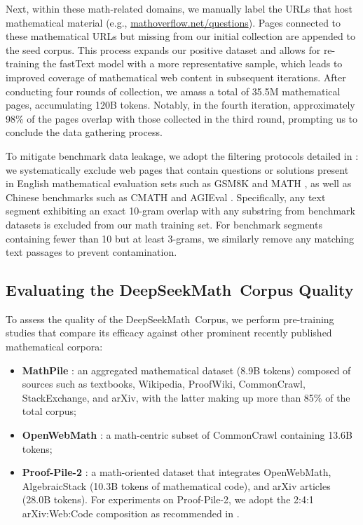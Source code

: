 Next, within these math-related domains, we manually label the URLs that host mathematical material (e.g., \url{mathoverflow.net/questions}). Pages connected to these mathematical URLs but missing from our initial collection are appended to the seed corpus. This process expands our positive dataset and allows for re-training the fastText model with a more representative sample, which leads to improved coverage of mathematical web content in subsequent iterations. After conducting four rounds of collection, we amass a total of 35.5M mathematical pages, accumulating 120B tokens. Notably, in the fourth iteration, approximately 98\% of the pages overlap with those collected in the third round, prompting us to conclude the data gathering process.

To mitigate benchmark data leakage, we adopt the filtering protocols detailed in \cite{deepseek-coder}: we systematically exclude web pages that contain questions or solutions present in English mathematical evaluation sets such as GSM8K \citep{gsm8k} and MATH \citep{MATH}, as well as Chinese benchmarks such as CMATH \citep{wei2023cmath} and AGIEval \citep{agieval}. Specifically, any text segment exhibiting an exact 10-gram overlap with any substring from benchmark datasets is excluded from our math training set. For benchmark segments containing fewer than 10 but at least 3-grams, we similarly remove any matching text passages to prevent contamination.

\subsection{Evaluating the DeepSeekMath~Corpus Quality}

To assess the quality of the DeepSeekMath~Corpus, we perform pre-training studies that compare its efficacy against other prominent recently published mathematical corpora:

\begin{itemize}[topsep=0pt]
    \item \textbf{MathPile} \citep{mathpile}: an aggregated mathematical dataset (8.9B tokens) composed of sources such as textbooks, Wikipedia, ProofWiki, CommonCrawl, StackExchange, and arXiv, with the latter making up more than 85\% of the total corpus;
    \item \textbf{OpenWebMath} \citep{openwebmath}: a math-centric subset of CommonCrawl containing 13.6B tokens;
    \item \textbf{Proof-Pile-2} \citep{llemma}: a math-oriented dataset that integrates OpenWebMath, AlgebraicStack (10.3B tokens of mathematical code), and arXiv articles (28.0B tokens). For experiments on Proof-Pile-2, we adopt the 2:4:1 arXiv:Web:Code composition as recommended in \cite{llemma}.
\end{itemize}

